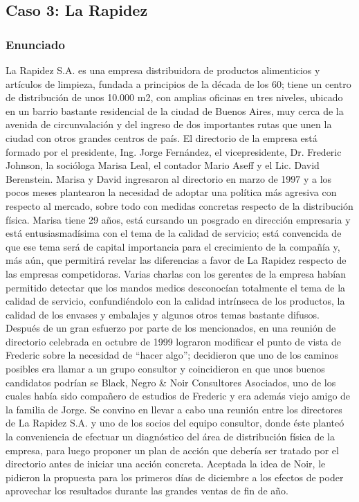 \documentclass[a4paper,10pt]{article}
\begin{document}
\begin{enumerate}
			\end{enumerate}
		
	\subsection{Caso 3: La Rapidez}
	\subsubsection{Enunciado}
	La Rapidez S.A. es una empresa distribuidora de productos alimenticios y artículos de limpieza, fundada a principios de la década de los 60; tiene un centro de distribución de unos 10.000 m2, con amplias oficinas en tres niveles, ubicado en un barrio bastante residencial de la ciudad de Buenos Aires, muy cerca de la avenida de circunvalación y del ingreso de dos importantes rutas que unen la ciudad con otros grandes centros de país. El directorio de la empresa está formado por el presidente, Ing. Jorge Fernández, el vicepresidente, Dr. Frederic Johnson, la socióloga Marisa Leal, el contador Mario Aseff y el Lic. David Berenstein. Marisa y David ingresaron al directorio en marzo de 1997 y a los pocos meses plantearon la necesidad de adoptar una política más agresiva con respecto al mercado, sobre todo con medidas concretas respecto de la distribución física. Marisa tiene 29 años, está cursando un posgrado en dirección empresaria y está entusiasmadísima con el  tema de la calidad de servicio; está convencida de que ese tema será de capital importancia para el crecimiento de la compañía y, más aún, que permitirá revelar las diferencias a favor de La Rapidez respecto de las empresas competidoras. Varias charlas con los gerentes de la empresa habían permitido detectar que los mandos medios desconocían totalmente el tema de la calidad de servicio, confundiéndolo con la calidad intrínseca de los productos, la calidad de los envases y embalajes y algunos otros temas bastante difusos.\\Despu\'es de un gran esfuerzo por parte de los mencionados, en una reunión de directorio celebrada en octubre de 1999 lograron modificar el punto de vista de Frederic sobre la necesidad de “hacer algo”; decidieron que uno de los caminos posibles era llamar a un grupo consultor y coincidieron en que unos buenos candidatos podrían se Black, Negro \& Noir Consultores Asociados, uno de los cuales había sido compañero de estudios de Frederic y era además viejo amigo de la familia de Jorge. Se convino en llevar a cabo una reunión entre los directores de La Rapidez S.A. y uno de los socios del equipo consultor, donde éste planteó la conveniencia de efectuar un diagnóstico del área de distribución física de la empresa, para luego proponer un plan de acción que debería ser tratado por el directorio antes de iniciar una acción concreta. Aceptada la idea de Noir, le pidieron la propuesta para los primeros días de diciembre a los efectos de poder aprovechar los resultados durante las grandes ventas de fin de año.\\
\end{document}

